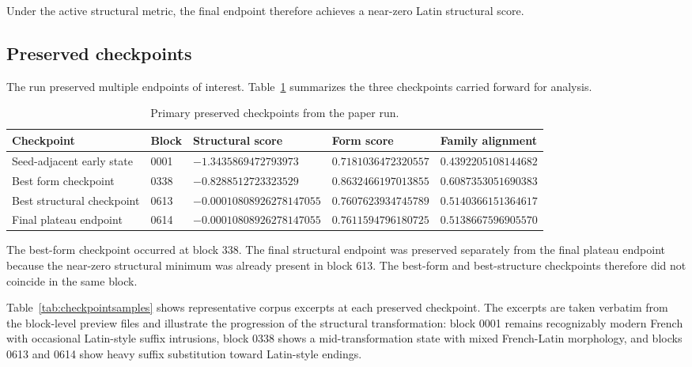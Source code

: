 \documentclass[11pt]{article}
\begin{document}
Under the active structural metric, the final endpoint therefore achieves
a near-zero Latin structural score.

\subsection{Preserved checkpoints}

The run preserved multiple endpoints of interest. Table~\ref{tab:checkpoints}
summarizes the three checkpoints carried forward for analysis.

\begin{table}[h]
\centering
\caption{Primary preserved checkpoints from the paper run.}
\label{tab:checkpoints}
\begin{tabular}{lllll}
\toprule
Checkpoint & Block & Structural score & Form score & Family alignment \\
\midrule
Seed-adjacent early state & 0001 & $-1.3435869472793973$ & $0.7181036472320557$ & $0.4392205108144682$ \\
Best form checkpoint & 0338 & $-0.8288512723323529$ & $0.8632466197013855$ & $0.6087353051690383$ \\
Best structural checkpoint & 0613 & $-0.00010808926278147055$ & $0.7607623934745789$ & $0.5140366151364617$ \\
Final plateau endpoint & 0614 & $-0.00010808926278147055$ & $0.7611594796180725$ & $0.5138667596905570$ \\
\bottomrule
\end{tabular}
\end{table}

The best-form checkpoint occurred at block 338. The final structural endpoint
was preserved separately from the final plateau endpoint because the
near-zero structural minimum was already present in block 613. The best-form
and best-structure checkpoints therefore did not coincide in the same block.

Table~\ref{tab:checkpointsamples} shows representative corpus excerpts at each
preserved checkpoint. The excerpts are taken verbatim from the block-level
preview files and illustrate the progression of the structural transformation:
block 0001 remains recognizably modern French with occasional Latin-style
suffix intrusions, block 0338 shows a mid-transformation state with mixed
French-Latin morphology, and blocks 0613 and 0614 show heavy suffix
substitution toward Latin-style endings.
\end{document}
